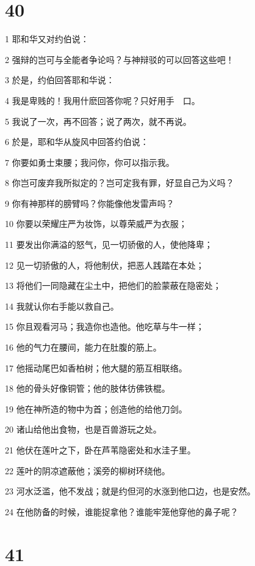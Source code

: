 \chapter{40}

\par 1 耶和华又对约伯说：
\par 2 强辩的岂可与全能者争论吗？与神辩驳的可以回答这些吧！
\par 3 於是，约伯回答耶和华说：
\par 4 我是卑贱的！我用什麽回答你呢？只好用手　口。
\par 5 我说了一次，再不回答；说了两次，就不再说。
\par 6 於是，耶和华从旋风中回答约伯说：
\par 7 你要如勇士束腰；我问你，你可以指示我。
\par 8 你岂可废弃我所拟定的？岂可定我有罪，好显自己为义吗？
\par 9 你有神那样的膀臂吗？你能像他发雷声吗？
\par 10 你要以荣耀庄严为妆饰，以尊荣威严为衣服；
\par 11 要发出你满溢的怒气，见一切骄傲的人，使他降卑；
\par 12 见一切骄傲的人，将他制伏，把恶人践踏在本处；
\par 13 将他们一同隐藏在尘土中，把他们的脸蒙蔽在隐密处；
\par 14 我就认你右手能以救自己。
\par 15 你且观看河马；我造你也造他。他吃草与牛一样；
\par 16 他的气力在腰间，能力在肚腹的筋上。
\par 17 他摇动尾巴如香柏树；他大腿的筋互相联络。
\par 18 他的骨头好像铜管；他的肢体彷佛铁棍。
\par 19 他在神所造的物中为首；创造他的给他刀剑。
\par 20 诸山给他出食物，也是百兽游玩之处。
\par 21 他伏在莲叶之下，卧在芦苇隐密处和水洼子里。
\par 22 莲叶的阴凉遮蔽他；溪旁的柳树环绕他。
\par 23 河水泛滥，他不发战；就是约但河的水涨到他口边，也是安然。
\par 24 在他防备的时候，谁能捉拿他？谁能牢笼他穿他的鼻子呢？

\chapter{41}


